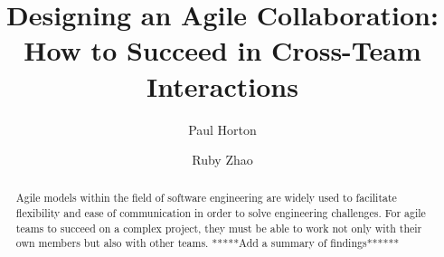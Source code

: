 \documentclass[sigplan,screen]{acmart}
\begin{document}
%
\title{Designing an Agile Collaboration: How to Succeed in Cross-Team Interactions}

%
\author{Paul Horton}

\author{Ruby Zhao}

%
\begin{abstract}
Agile models within the field of software engineering are widely used to facilitate flexibility and ease of communication in order to solve engineering challenges. For agile teams to succeed on a complex project, they must be able to work not only with their own members but also with other teams.
*****Add a summary of findings******
\end{abstract}

%

%

%
\maketitle
\end{document}
